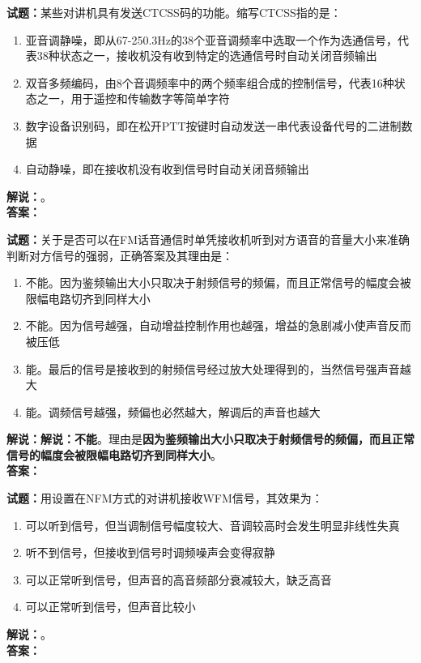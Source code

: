 \documentclass{ctexbook}
\begin{document}
\vspace{\baselineskip}

\noindent\textbf{试题：}某些对讲机具有发送CTCSS码的功能。缩写CTCSS指的是：
\begin{enumerate}[leftmargin=3em]
  \item 亚音调静噪，即从67-250.3Hz的38个亚音调频率中选取一个作为选通信号，代表38种状态之一，接收机没有收到特定的选通信号时自动关闭音频输出
  \item 双音多频编码，由8个音调频率中的两个频率组合成的控制信号，代表16种状态之一，用于遥控和传输数字等简单字符
  \item 数字设备识别码，即在松开PTT按键时自动发送一串代表设备代号的二进制数据
  \item 自动静噪，即在接收机没有收到信号时自动关闭音频输出
\end{enumerate}
\noindent\textbf{解说：}\textbf{}。\\\noindent\textbf{答案：}

\vspace{\baselineskip}

\noindent\textbf{试题：}关于是否可以在FM话音通信时单凭接收机听到对方语音的音量大小来准确判断对方信号的强弱，正确答案及其理由是：
\begin{enumerate}[leftmargin=3em]
  \item 不能。因为鉴频输出大小只取决于射频信号的频偏，而且正常信号的幅度会被限幅电路切齐到同样大小
  \item 不能。因为信号越强，自动增益控制作用也越强，增益的急剧减小使声音反而被压低
  \item 能。最后的信号是接收到的射频信号经过放大处理得到的，当然信号强声音越大
  \item 能。调频信号越强，频偏也必然越大，解调后的声音也越大
\end{enumerate}
\noindent\textbf{解说：}\noindent\textbf{解说：}\textbf{不能}。理由是\textbf{因为鉴频输出大小只取决于射频信号的频偏，而且正常信号的幅度会被限幅电路切齐到同样大小}。\\\noindent\textbf{答案：}

\vspace{\baselineskip}

\noindent\textbf{试题：}用设置在NFM方式的对讲机接收WFM信号，其效果为：
\begin{enumerate}[leftmargin=3em]
  \item 可以听到信号，但当调制信号幅度较大、音调较高时会发生明显非线性失真
  \item 听不到信号，但接收到信号时调频噪声会变得寂静
  \item 可以正常听到信号，但声音的高音频部分衰减较大，缺乏高音
  \item 可以正常听到信号，但声音比较小
\end{enumerate}
\noindent\textbf{解说：}\textbf{}。\\\noindent\textbf{答案：}
\end{document}
